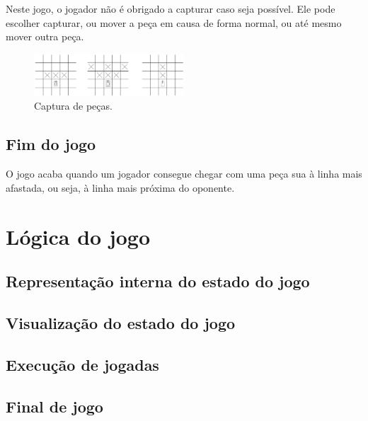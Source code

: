 \documentclass[a4paper,11pt,portuguese]{article}
\begin{document}
\noindent Neste jogo, o jogador não é obrigado a capturar caso seja possível.
Ele pode escolher capturar, ou mover a peça em causa de forma normal, ou até
mesmo mover outra peça.

\begin{figure}[H]
    \centering
    \includegraphics[width=0.5\textwidth]{imgs/capture.png}
    \caption{Captura de peças.}
    \label{fig:capture}
\end{figure}

\subsection{Fim do jogo}

O jogo acaba quando um jogador consegue chegar com uma peça sua à linha mais
afastada, ou seja, à linha mais próxima do oponente.


\section{Lógica do jogo}

    \subsection{Representação interna do estado do jogo}



    \subsection{Visualização do estado do jogo}



    \subsection{Execução de jogadas}



    \subsection{Final de jogo}
\end{document}

